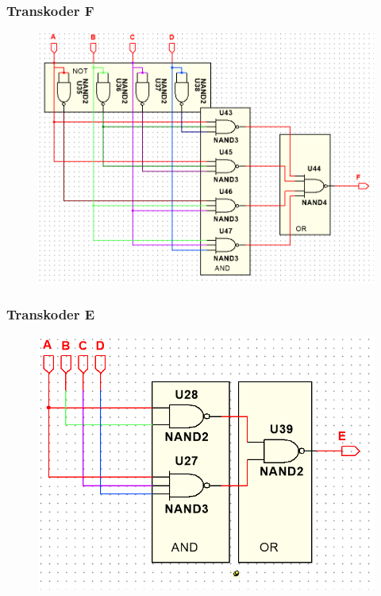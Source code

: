 \documentclass[a4paper]{article}
\begin{document}
\subsubsection{Transkoder F}
\begin{figure}[H]
 \centering
 \includegraphics{schemat_F.png}
\end{figure}

\subsubsection{Transkoder E}
\begin{figure}[H]
 \centering
 \includegraphics{schemat_E.png}
\end{figure}
\end{document}
